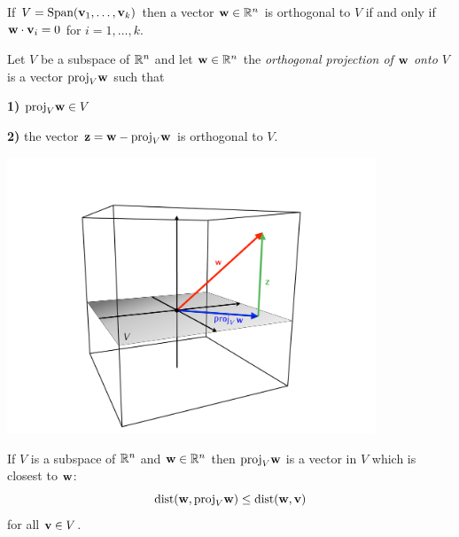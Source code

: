 {\vskip 5mm

\begin{cbox}[Proposition]
If $V = \text{Span}({\bf v}_{1}, \dots, {\bf v}_{k})$ then a vector ${\bf w}\in {\mathbb R}^{n}$ is  orthogonal to $V$ if 
and only if ${\bf w}\cdot {\bf v}_{i} = 0$ for  $i=1, \dots, k$.  
\end{cbox}



\newpage


\begin{cbox}[Definition]
Let $V$ be a subspace of ${\mathbb R}^{n}$ and let ${\bf w}\in {\mathbb R}^{n}$ the \emph{orthogonal projection of ${\bf w}$
onto $V$} is a vector $\text{proj}_{V}{\bf w}$ such that 
\benu
\item[{\bf 1)}]  $\text{proj}_{V}{\bf w} \in V$ \\[-4mm]
\item[{\bf 2)}]  the vector ${\bf z} = {\bf w} - \text{proj}_{V}{\bf w}$ is orthogonal to $V$.
\eenu
\end{cbox}

\vskip 20mm

\begin{center}
\includegraphics[width=110mm]{orthogonal_proj.pdf}
\end{center}





\newpage


\begin{cbox}
If $V$ is a subspace of ${\mathbb R}^{n}$ and ${\bf w}\in {\mathbb R}^{n}$ then $\text{proj}_{V}{\bf w}$ is a vector in $V$ which is 
closest to ${\bf w}$: 
$$\text{dist}({\bf w}, \text{proj}_{V}{\bf w}) \leq \text{dist}({\bf w}, {\bf v})$$
for all ${\bf v} \in V$.  
\end{cbox}




}
